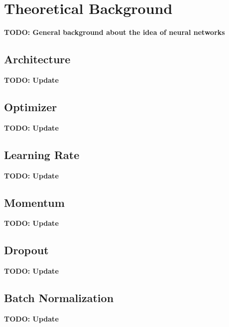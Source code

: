 \documentclass[11pt]{amsart}
\begin{document}

\section{Theoretical Background}\label{sec:theory}
\textbf{TODO: General background about the idea of neural networks}

\subsection{Architecture}
\textbf{TODO: Update}

\subsection{Optimizer}
\textbf{TODO: Update}

\subsection{Learning Rate}
\textbf{TODO: Update}

\subsection{Momentum}
\textbf{TODO: Update}

\subsection{Dropout}
\textbf{TODO: Update}

\subsection{Batch Normalization}
\textbf{TODO: Update}
\end{document}
